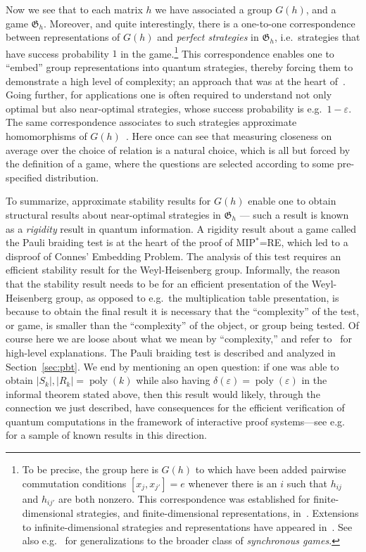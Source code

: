 \documentclass[11pt]{article}
\theoremstyle{definition}
\DeclareMathOperator{\poly}{poly}
\newcommand{\eps}{\varepsilon}
\newcommand{\game}{\mathfrak{G}}
\begin{document}
Now we see that to each matrix $h$ we have associated a group $G(h)$, and a game $\game_h$. Moreover, and quite interestingly, there is a one-to-one correspondence between representations of $G(h)$ and \emph{perfect strategies} in $\game_h$, i.e.\ strategies that have success probability $1$ in the game.\footnote{To be precise, the group here is $G(h)$ to which have been added pairwise commutation conditions $[x_j,x_{j'}]=e$ whenever there is an $i$ such that $h_{ij}$ and $h_{ij'}$ are both nonzero. This correspondence was established for finite-dimensional strategies, and finite-dimensional representations, in~\cite{cleve2014characterization}. Extensions to infinite-dimensional strategies and representations have appeared in~\cite{cleve2017perfect}. See also e.g.~\cite{kim2018synchronous} for generalizations to the broader class of \emph{synchronous games}.}
This correspondence enables one to ``embed'' group representations into quantum strategies, thereby forcing them to demonstrate a high level of complexity; an approach that was at the heart of~\cite{kim2018synchronous}. Going further, for applications one is often required to understand not only optimal but also near-optimal strategies, whose success probability is e.g.\ $1-\eps$. The same correspondence associates to such strategies approximate homomorphisms of $G(h)$~\cite{slofstra2018entanglement}. Here once can see that measuring closeness on average over the choice of relation is a natural choice, which is all but forced by the definition of a game, where the questions are selected according to some pre-specified distribution. 

To summarize, approximate stability results for $G(h)$ enable one to obtain structural results about near-optimal strategies in $\game_h$ --- such a result is known as a \emph{rigidity} result in quantum information. A rigidity result about a game called the Pauli braiding test is at the heart of the proof of MIP$^*$=RE, which led to a disproof of Connes' Embedding Problem. The analysis of this test requires an efficient stability result for the Weyl-Heisenberg group. Informally, the reason that the stability result needs to be for an efficient presentation of the Weyl-Heisenberg group, as opposed to e.g.\ the multiplication table presentation, is because to obtain the final result it is necessary that the ``complexity'' of the test, or game, is smaller than the ``complexity'' of the object, or group being tested. Of course here we are loose about what we mean by ``complexity,'' and refer to~\cite{ji2021mip,vidickmip} for high-level explanations. The Pauli braiding test is described and analyzed in Section~\ref{sec:pbt}. We end by mentioning an open question: if one was able to obtain $|S_k|,|R_k|=\poly(k)$ while also having $\delta(\eps)=\poly(\eps)$ in the informal theorem stated above, then this result would likely, through the connection we just described, have consequences for the efficient verification of quantum computations in the framework of interactive proof systems---see e.g.~\cite{coladangelo2019verifier,natarajan2023bounding} for a sample of known results in this direction. 
\end{document}
